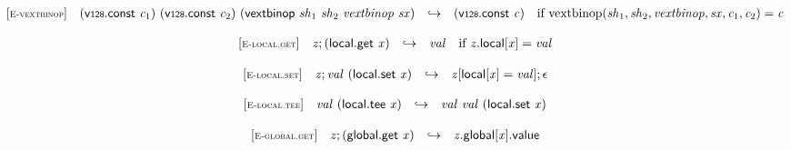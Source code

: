 \vspace{1ex}

$$
\begin{array}{@{}l@{}lcl@{}l@{}}
{[\textsc{\scriptsize E{-}vextbinop}]} \quad & (\mathsf{v{\scriptstyle128}}.\mathsf{const}~{\mathit{c}}_{{1}})~(\mathsf{v{\scriptstyle128}}.\mathsf{const}~{\mathit{c}}_{{2}})~(\mathsf{vextbinop}~{\mathit{sh}}_{{1}}~{\mathit{sh}}_{{2}}~{\mathit{vextbinop}}~{\mathit{sx}}) &\hookrightarrow& (\mathsf{v{\scriptstyle128}}.\mathsf{const}~{\mathit{c}}) &\quad
  \mbox{if}~{\mathrm{vextbinop}}({\mathit{sh}}_{{1}}, {\mathit{sh}}_{{2}}, {\mathit{vextbinop}}, {\mathit{sx}}, {\mathit{c}}_{{1}}, {\mathit{c}}_{{2}}) = {\mathit{c}} \\
\end{array}
$$

\vspace{1ex}

$$
\begin{array}{@{}l@{}lcl@{}l@{}}
{[\textsc{\scriptsize E{-}local.get}]} \quad & {\mathit{z}} ; (\mathsf{local.get}~{\mathit{x}}) &\hookrightarrow& {\mathit{val}} &\quad
  \mbox{if}~{{\mathit{z}}.\mathsf{local}}{{}[{\mathit{x}}]} = {\mathit{val}} \\
\end{array}
$$

$$
\begin{array}{@{}l@{}lcl@{}l@{}}
{[\textsc{\scriptsize E{-}local.set}]} \quad & {\mathit{z}} ; {\mathit{val}}~(\mathsf{local.set}~{\mathit{x}}) &\hookrightarrow& {\mathit{z}}{}[\mathsf{local}{}[{\mathit{x}}] = {\mathit{val}}] ; \epsilon &  \\
\end{array}
$$

$$
\begin{array}{@{}l@{}lcl@{}l@{}}
{[\textsc{\scriptsize E{-}local.tee}]} \quad & {\mathit{val}}~(\mathsf{local.tee}~{\mathit{x}}) &\hookrightarrow& {\mathit{val}}~{\mathit{val}}~(\mathsf{local.set}~{\mathit{x}}) &  \\
\end{array}
$$

\vspace{1ex}

$$
\begin{array}{@{}l@{}lcl@{}l@{}}
{[\textsc{\scriptsize E{-}global.get}]} \quad & {\mathit{z}} ; (\mathsf{global.get}~{\mathit{x}}) &\hookrightarrow& {{\mathit{z}}.\mathsf{global}}{{}[{\mathit{x}}]}.\mathsf{value} &  \\
\end{array}
$$

